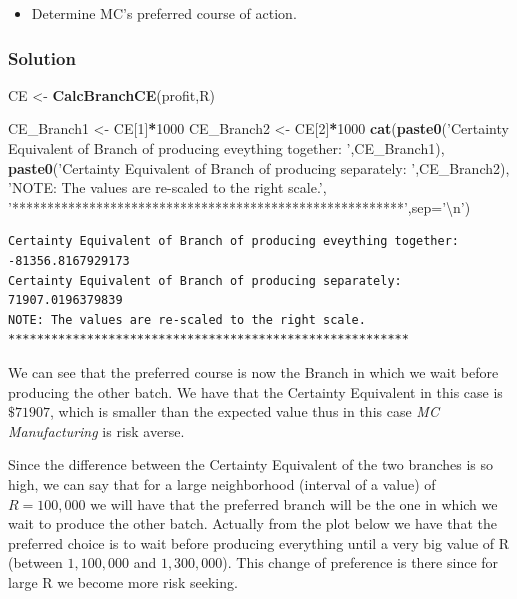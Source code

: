 \documentclass[]{article}
\newenvironment{Shaded}{\begin{snugshade}}{\end{snugshade}}
\newcommand{\KeywordTok}[1]{\textcolor[rgb]{0.13,0.29,0.53}{\textbf{#1}}}
\newcommand{\DataTypeTok}[1]{\textcolor[rgb]{0.13,0.29,0.53}{#1}}
\newcommand{\DecValTok}[1]{\textcolor[rgb]{0.00,0.00,0.81}{#1}}
\newcommand{\CharTok}[1]{\textcolor[rgb]{0.31,0.60,0.02}{#1}}
\newcommand{\StringTok}[1]{\textcolor[rgb]{0.31,0.60,0.02}{#1}}
\newcommand{\OperatorTok}[1]{\textcolor[rgb]{0.81,0.36,0.00}{\textbf{#1}}}
\newcommand{\NormalTok}[1]{#1}
\providecommand{\tightlist}{%
  \setlength{\itemsep}{0pt}\setlength{\parskip}{0pt}}
\begin{document}
\begin{itemize}
\tightlist
\item
  Determine MC's preferred course of action.
\end{itemize}

\subsubsection{Solution}\label{solution-2}

\begin{Shaded}
\begin{Highlighting}[]
\NormalTok{CE <-}\StringTok{ }\KeywordTok{CalcBranchCE}\NormalTok{(profit,R)}

\NormalTok{CE_Branch1 <-}\StringTok{ }\NormalTok{CE[}\DecValTok{1}\NormalTok{]}\OperatorTok{*}\DecValTok{1000}
\NormalTok{CE_Branch2 <-}\StringTok{ }\NormalTok{CE[}\DecValTok{2}\NormalTok{]}\OperatorTok{*}\DecValTok{1000}
\KeywordTok{cat}\NormalTok{(}\KeywordTok{paste0}\NormalTok{(}\StringTok{'Certainty Equivalent of Branch of producing eveything together: '}\NormalTok{,CE_Branch1),}
    \KeywordTok{paste0}\NormalTok{(}\StringTok{'Certainty Equivalent of Branch of producing separately: '}\NormalTok{,CE_Branch2),}
    \StringTok{'NOTE: The values are re-scaled to the right scale.'}\NormalTok{,}
    \StringTok{'********************************************************'}\NormalTok{,}\DataTypeTok{sep=}\StringTok{'}\CharTok{\textbackslash{}n}\StringTok{'}\NormalTok{)}
\end{Highlighting}
\end{Shaded}

\begin{verbatim}
Certainty Equivalent of Branch of producing eveything together: -81356.8167929173
Certainty Equivalent of Branch of producing separately: 71907.0196379839
NOTE: The values are re-scaled to the right scale.
********************************************************
\end{verbatim}

We can see that the preferred course is now the Branch in which we wait
before producing the other batch. We have that the Certainty Equivalent
in this case is \(\$71907\), which is smaller than the expected value
thus in this case \emph{MC Manufacturing} is risk averse.

Since the difference between the Certainty Equivalent of the two
branches is so high, we can say that for a large neighborhood (interval
of a value) of \(R = 100,000\) we will have that the preferred branch
will be the one in which we wait to produce the other batch. Actually
from the plot below we have that the preferred choice is to wait before
producing everything until a very big value of R (between \(1,100,000\)
and \(1,300,000\)). This change of preference is there since for large R
we become more risk seeking.
\end{document}
